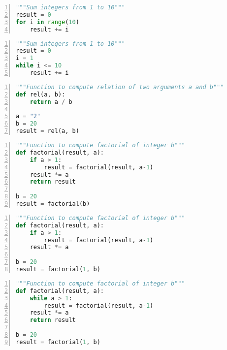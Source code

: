 \documentclass[25pt,a4paper]{article}
\begin{document}
\small
\begin{lstlisting}[language=Python,frame=single,numbers=left,title=Script 0]
"""Sum integers from 1 to 10"""
result = 0
for i in range(10)
    result += i
\end{lstlisting}
\normalsize

\small
\begin{lstlisting}[language=Python,frame=single,numbers=left,title=Script 1]
"""Sum integers from 1 to 10"""
result = 0
i = 1
while i <= 10
    result += i
\end{lstlisting}
\normalsize

\newpage

\small
\begin{lstlisting}[language=Python,frame=single,numbers=left,title=Script 2]
"""Function to compute relation of two arguments a and b"""
def rel(a, b):
    return a / b

a = "2"
b = 20
result = rel(a, b)  
\end{lstlisting}
\normalsize

\small
\begin{lstlisting}[language=Python,frame=single,numbers=left,title=Script 3]
"""Function to compute factorial of integer b"""
def factorial(result, a):
    if a > 1:
        result = factorial(result, a-1)
    result *= a
    return result

b = 20
result = factorial(b)  
\end{lstlisting}
\normalsize

\small
\begin{lstlisting}[language=Python,frame=single,numbers=left,title=Script 4]
"""Function to compute factorial of integer b"""
def factorial(result, a):
    if a > 1:
        result = factorial(result, a-1)
    result *= a
  
b = 20
result = factorial(1, b)  
\end{lstlisting}
\normalsize

\small
\begin{lstlisting}[language=Python,frame=single,numbers=left,title=Script 5]
"""Function to compute factorial of integer b"""
def factorial(result, a):
    while a > 1:
        result = factorial(result, a-1)
    result *= a
    return result

b = 20
result = factorial(1, b)  
\end{lstlisting}
\normalsize
\end{document}
